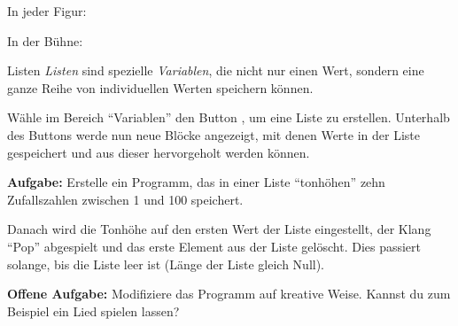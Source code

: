 \documentclass[lerntheke,12pt,a5paper,landscape]{arbeitsblatt}
\begin{document}
\begin{loesungskarte}
\begin{multicols}{2}
	In jeder Figur:

	\begin{scratch}[scale=0.7]
	\end{scratch}

	\begin{scratch}[scale=0.7]
	\end{scratch}
	\columnbreak

	In der Bühne:

	\begin{scratch}[scale=0.7]
	\end{scratch}

	\begin{scratch}[scale=0.7]
	\end{scratch}
\end{multicols}
\end{loesungskarte}


\begin{karte3}{Listen}
	\emph{Listen} sind spezielle \emph{Variablen}, die nicht nur einen Wert, sondern eine ganze Reihe von individuellen Werten speichern können.

	Wähle im Bereich \enquote{Variablen} den Button , um eine Liste zu erstellen. Unterhalb des Buttons werde nun neue Blöcke angezeigt, mit denen Werte in der Liste gespeichert und aus dieser hervorgeholt werden können.

	\textbf{Aufgabe:} Erstelle ein Programm, das in einer Liste \enquote{tonhöhen} zehn Zufallszahlen zwischen 1 und 100 speichert.

	Danach wird die Tonhöhe auf den ersten Wert der Liste eingestellt, der Klang \enquote{Pop} abgespielt und das erste Element aus der Liste gelöscht. Dies passiert solange, bis die Liste leer ist (Länge der Liste gleich Null).

	\textbf{Offene Aufgabe:} Modifiziere das Programm auf kreative Weise. Kannst du zum Beispiel ein Lied spielen lassen?
\end{karte3}
\end{document}
